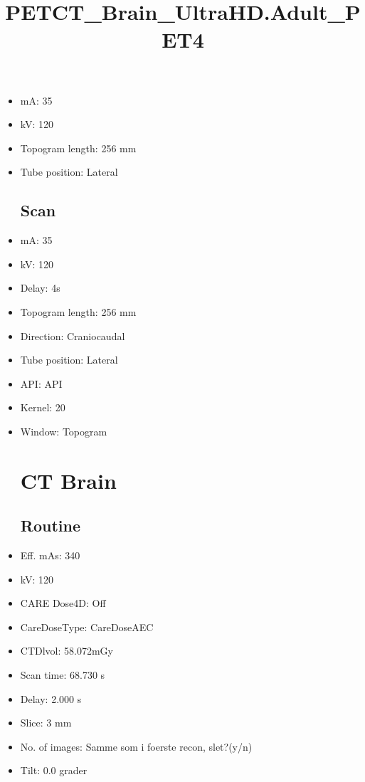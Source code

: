 \documentclass[12pt]{article}
\title{PETCT\_Brain\_UltraHD.Adult\_PET4}
\begin{document}
\maketitle
\newpage
\tableofcontents
\newpage
{}


\begin{itemize}\section{Topogram}
\subsection{Routine}
\item mA: 35\item kV: 120\item Topogram length: 256 mm\item Tube position: Lateral
\subsection{Scan}\item mA: 35\item kV: 120\item Delay: 4s\item Topogram length: 256 mm\item Direction: Craniocaudal\item Tube position: Lateral\item API: API \item Kernel: 20\item Window: Topogram
\section{CT Brain}
\subsection{Routine}
\item Eff. mAs: 340\item kV: 120\item CARE Dose4D: Off\item CareDoseType: CareDoseAEC\item CTDlvol: 58.072mGy\item Scan time: 68.730 s\item Delay: 2.000 s\item Slice: 3 mm\item No. of images: Samme som i foerste recon, slet?(y/n)\item Tilt: 0.0 grader

\end{itemize}
\end{document}
